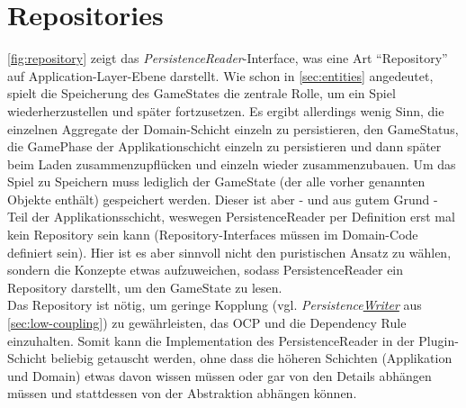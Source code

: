 \section{Repositories}

\autoref{fig:repository} zeigt das \textit{PersistenceReader}-Interface, was eine Art \enquote{Repository} auf Application-Layer-Ebene darstellt.
Wie schon in \autoref{sec:entities} angedeutet, spielt die Speicherung des GameStates die zentrale Rolle, um ein Spiel wiederherzustellen 
und später fortzusetzen. Es ergibt allerdings wenig Sinn, die einzelnen Aggregate der Domain-Schicht einzeln zu persistieren, den 
GameStatus, die GamePhase der Applikationschicht einzeln zu persistieren und dann später beim Laden zusammenzupflücken und 
einzeln wieder zusammenzubauen. Um das Spiel zu Speichern muss lediglich der GameState (der alle vorher genannten Objekte enthält) 
gespeichert werden. Dieser ist aber - und aus gutem Grund - Teil der Applikationsschicht, weswegen PersistenceReader per Definition
erst mal kein Repository sein kann (Repository-Interfaces müssen im Domain-Code definiert sein). Hier ist es aber sinnvoll nicht den 
puristischen Ansatz zu wählen, sondern die Konzepte etwas aufzuweichen, sodass PersistenceReader ein Repository darstellt, 
um den GameState zu lesen. \\
Das Repository ist nötig, um geringe Kopplung (vgl. \textit{Persistence\underline{Writer}} aus \autoref{sec:low-coupling}) zu gewährleisten, 
das OCP und die Dependency Rule einzuhalten. Somit kann die Implementation des PersistenceReader in der Plugin-Schicht beliebig getauscht werden,
ohne dass die höheren Schichten (Applikation und Domain) etwas davon wissen müssen oder gar von den Details abhängen müssen und 
stattdessen von der Abstraktion abhängen können. 

